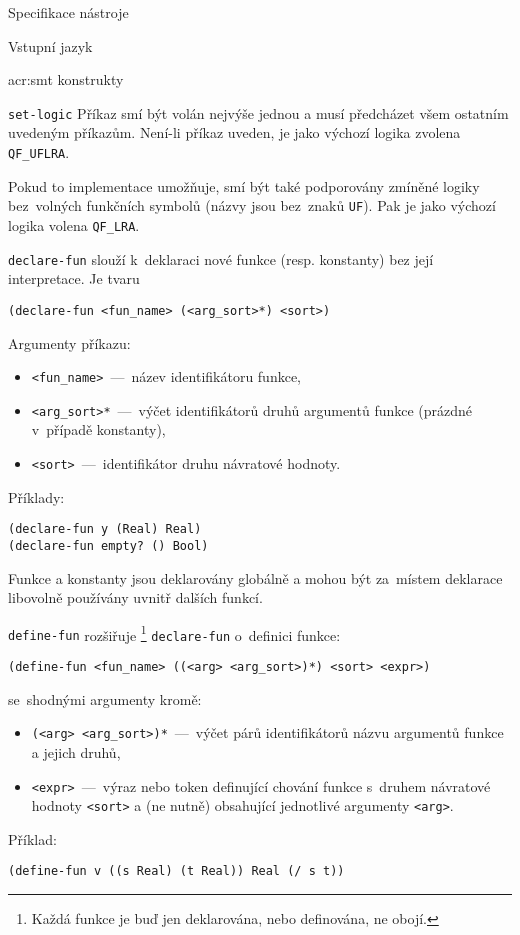 \documentclass[thesis=M,czech]{FITthesis}[2012/06/26]
\newcommand{\acrlabel}[1]{acr:#1}
\newcommand{\acr}[1]{\acrshort{\acrlabel{#1}}}
\newcommand{\id}[1]{\texttt{#1}}
\begin{document}
\begin{section}{Specifikace nástroje}
\begin{subsection}{Vstupní jazyk}
\begin{subsubsection}{\acr{smt} konstrukty}
\begin{paragraph}{\id{set-logic}}
Příkaz smí být volán nejvýše jednou
a musí předcházet všem ostatním uvedeným příkazům.
Není-li příkaz uveden, je jako výchozí logika zvolena \id{QF\_\-UFLRA}.

Pokud to implementace umožňuje,
smí být také podporovány zmíněné logiky
bez~volných funkčních symbolů (názvy jsou bez~znaků \id{UF}).
Pak je jako výchozí logika volena \id{QF\_\-LRA}.
\end{paragraph} %


\begin{paragraph}{\id{declare-fun}}\label{p:design:spec:ilang:smt:declfun}
slouží k~deklaraci nové funkce (resp. konstanty)
bez její interpretace.
Je tvaru
\begin{center}
\id{(declare-fun <fun\_\-name> (<arg\_\-sort>*) <sort>)}
\end{center}
Argumenty příkazu:
\begin{itemize}
\item \id{<fun\_\-name>}~---~název identifikátoru funkce,
\item \id{<arg\_\-sort>*}~---~výčet identifikátorů druhů
   argumentů funkce (prázdné v~případě konstanty),
\item \id{<sort>}~---~identifikátor druhu návratové hodnoty.
\end{itemize}
Příklady:
\begin{center}
\id{(declare-fun y (Real) Real)}\\
\id{(declare-fun empty? () Bool)}
\end{center}

Funkce a konstanty jsou deklarovány globálně
a mohou být za~místem deklarace
libovolně používány uvnitř dalších funkcí.
\end{paragraph} %


\begin{paragraph}{\id{define-fun}}\label{p:design:spec:ilang:smt:defun}
rozšiřuje%
\footnote{Každá funkce je buď jen deklarována,
nebo definována, ne obojí.}
\id{declare\--fun} o~definici funkce:
\begin{center}
\id{(define-fun <fun\_\-name> ((<arg> <arg\_\-sort>)*) <sort> <expr>)}
\end{center}
se~shodnými argumenty kromě:
\begin{itemize}
\item \id{(<arg> <arg\_\-sort>)*}~---~výčet párů identifikátorů
   názvu argumentů funkce a jejich druhů,
\item \id{<expr>}~---~výraz nebo token definující chování funkce
   s~druhem návratové hodnoty \id{<sort>}
   a (ne nutně) obsahující jednotlivé argumenty \id{<arg>}.
\end{itemize}
Příklad:
\begin{center}
\id{(define-fun v~((s~Real) (t Real)) Real (/ s~t))}
\end{center}
\end{paragraph} %


\end{subsubsection}
\end{subsection}
\end{section}
\end{document}
